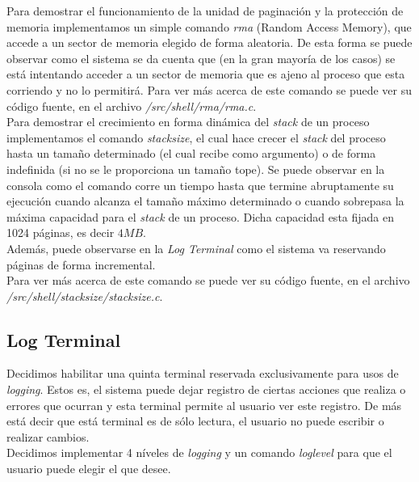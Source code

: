 \documentclass[a4paper,10pt]{article}
\begin{document}
        Para demostrar el funcionamiento de la unidad de paginación y la protección de memoria implementamos un simple comando \textit{rma} (Random Access Memory), 
        que accede a un sector de memoria elegido de forma aleatoria. De esta forma se puede observar como el sistema se da cuenta que (en la gran mayoría de 
        los casos) se está intentando acceder a un sector de memoria que es ajeno al proceso que esta corriendo y no lo permitirá. Para ver más acerca de este 
        comando se puede ver su código fuente, en el archivo \textit{/src/shell/rma/rma.c}.\\

        Para demostrar el crecimiento en forma dinámica del \textit{stack} de un proceso implementamos el comando \textit{stacksize}, el cual hace crecer el 
        \textit{stack} del proceso hasta un tamaño determinado (el cual recibe como argumento) o de forma indefinida (si no se le proporciona un tamaño tope).
        Se puede observar en la consola como el comando corre un tiempo hasta que termine abruptamente su ejecución cuando alcanza el tamaño máximo determinado 
        o cuando sobrepasa la máxima capacidad para el \textit{stack} de un proceso. Dicha capacidad esta fijada en 1024 páginas, es decir $4 MB$.\\

        Además, puede observarse en la \textit{Log Terminal} como el sistema va reservando páginas de forma incremental.\\

        Para ver más acerca de este comando se puede ver su código fuente, en el archivo \textit{/src/shell/stacksize/stacksize.c}.\\


        \subsection{Log Terminal}

        Decidimos habilitar una quinta terminal reservada exclusivamente para usos de \textit{logging}. 
        Estos es, el sistema puede dejar registro de ciertas acciones que realiza o errores que ocurran y esta terminal permite al usuario ver este registro. De más
        está decir que está terminal es de sólo lectura, el usuario no puede escribir o realizar cambios.\\

        Decidimos implementar 4 níveles de \textit{logging} y un comando \textit{loglevel} para que el usuario puede elegir el que desee.\\
\end{document}
